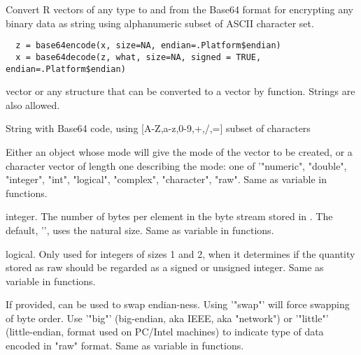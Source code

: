 \begin{Description}\relax
Convert R vectors of any type to and from the Base64 format for encrypting
any binary data as string using alphanumeric subset of ASCII character set.
\end{Description}
\begin{Usage}
\begin{verbatim}
  z = base64encode(x, size=NA, endian=.Platform$endian)
  x = base64decode(z, what, size=NA, signed = TRUE, endian=.Platform$endian)
\end{verbatim}
\end{Usage}
\begin{Arguments}
\begin{ldescription}
\item[\code{x}] vector or any structure that can be converted to a vector by  
 function. Strings are also allowed.
\item[\code{z}] String with Base64 code, using [A-Z,a-z,0-9,+,/,=] subset of 
characters
\item[\code{what}] Either an object whose mode will give the mode of the vector
to be created, or a character vector of length one describing
the mode: one of '"numeric", "double", "integer", "int",
"logical", "complex", "character", "raw".  
Same as variable  in  functions. 
\item[\code{size}] integer.  The number of bytes per element in the byte stream 
stored in . The default, '', uses the natural size. 
Same as variable  in  functions. 
\item[\code{signed}] logical. Only used for integers of sizes 1 and 2, when it
determines if the quantity stored as raw should be regarded as a
signed or unsigned integer.
Same as variable  in  functions. 
\item[\code{endian}] If provided, can be used to swap endian-ness. Using '"swap"' 
will force swapping of byte order. Use '"big"' (big-endian, aka IEEE, 
aka "network") or '"little"' (little-endian, format used on PC/Intel 
machines) to indicate type of data encoded in "raw" format.
Same as variable  in  functions.
\end{ldescription}
\end{Arguments}
